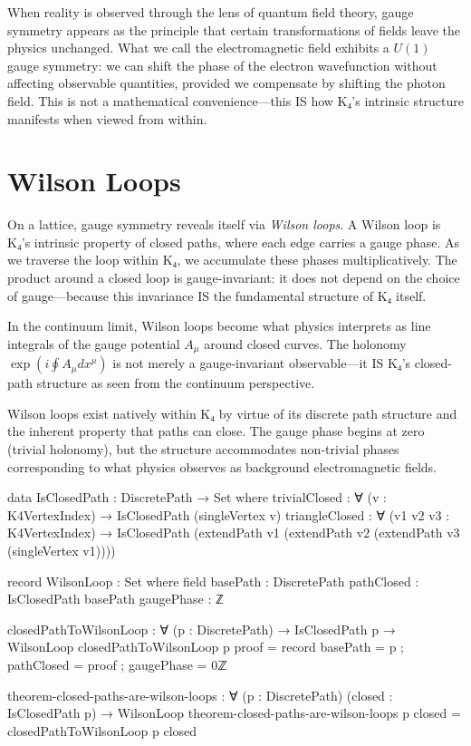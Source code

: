 \documentclass[11pt,a4paper]{book}
\begin{document}
When reality is observed through the lens of quantum field theory, gauge symmetry appears as the principle that certain transformations of fields leave the physics unchanged. What we call the electromagnetic field exhibits a $U(1)$ gauge symmetry: we can shift the phase of the electron wavefunction without affecting observable quantities, provided we compensate by shifting the photon field. This is not a mathematical convenience—this IS how K₄'s intrinsic structure manifests when viewed from within.

\section{Wilson Loops}

On a lattice, gauge symmetry reveals itself via \emph{Wilson loops}. A Wilson loop is K₄'s intrinsic property of closed paths, where each edge carries a gauge phase. As we traverse the loop within K₄, we accumulate these phases multiplicatively. The product around a closed loop is gauge-invariant: it does not depend on the choice of gauge—because this invariance IS the fundamental structure of K₄ itself.

In the continuum limit, Wilson loops become what physics interprets as line integrals of the gauge potential $A_\mu$ around closed curves. The holonomy $\exp(i \oint A_\mu dx^\mu)$ is not merely a gauge-invariant observable—it IS K₄'s closed-path structure as seen from the continuum perspective.

Wilson loops exist natively within K₄ by virtue of its discrete path structure and the inherent property that paths can close. The gauge phase begins at zero (trivial holonomy), but the structure accommodates non-trivial phases corresponding to what physics observes as background electromagnetic fields.

\begin{code}
data IsClosedPath : DiscretePath → Set where
  trivialClosed : ∀ (v : K4VertexIndex) → IsClosedPath (singleVertex v)
  triangleClosed : ∀ (v1 v2 v3 : K4VertexIndex) → 
    IsClosedPath (extendPath v1 (extendPath v2 (extendPath v3 (singleVertex v1))))

record WilsonLoop : Set where
  field
    basePath : DiscretePath
    pathClosed : IsClosedPath basePath
    gaugePhase : ℤ

closedPathToWilsonLoop : ∀ (p : DiscretePath) → IsClosedPath p → WilsonLoop
closedPathToWilsonLoop p proof = record
  { basePath = p
  ; pathClosed = proof
  ; gaugePhase = 0ℤ
  }

theorem-closed-paths-are-wilson-loops : ∀ (p : DiscretePath) (closed : IsClosedPath p) →
  WilsonLoop
theorem-closed-paths-are-wilson-loops p closed = closedPathToWilsonLoop p closed
\end{code}
\end{document}
